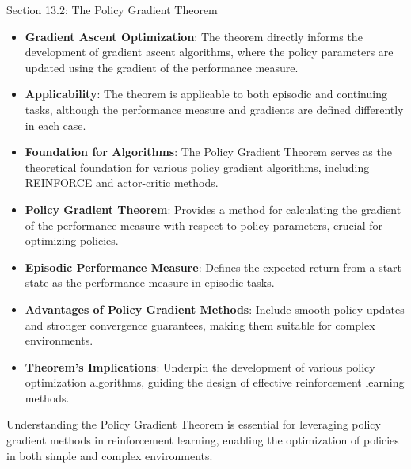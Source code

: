\begin{notes}{Section 13.2: The Policy Gradient Theorem}
\begin{highlight}
        \begin{itemize}
            \item \textbf{Gradient Ascent Optimization}: The theorem directly informs the development of gradient ascent algorithms, where the policy parameters are updated using the gradient of the 
            performance measure.
            \item \textbf{Applicability}: The theorem is applicable to both episodic and continuing tasks, although the performance measure and gradients are defined differently in each case.
            \item \textbf{Foundation for Algorithms}: The Policy Gradient Theorem serves as the theoretical foundation for various policy gradient algorithms, including REINFORCE and actor-critic methods.
        \end{itemize}
    
    \end{highlight}
    
    \begin{highlight}
    
        \begin{itemize}
            \item \textbf{Policy Gradient Theorem}: Provides a method for calculating the gradient of the performance measure with respect to policy parameters, crucial for optimizing policies.
            \item \textbf{Episodic Performance Measure}: Defines the expected return from a start state as the performance measure in episodic tasks.
            \item \textbf{Advantages of Policy Gradient Methods}: Include smooth policy updates and stronger convergence guarantees, making them suitable for complex environments.
            \item \textbf{Theorem's Implications}: Underpin the development of various policy optimization algorithms, guiding the design of effective reinforcement learning methods.
        \end{itemize}
    
        Understanding the Policy Gradient Theorem is essential for leveraging policy gradient methods in reinforcement learning, enabling the optimization of policies in both simple and complex environments.
    
    \end{highlight}
\end{notes}

